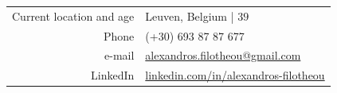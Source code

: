 \documentclass[a4paper,10pt,twoside]{article}
\begin{document}


\par{\bigskip\par}
\vspace{4em}
\begin{center}
\begin{tabular}{rp{10cm}}
Current location and age                & Leuven, Belgium | $39$ \\
Phone                                   & (+30) 693 87 87 677 \\
e-mail                                  & \href{mailto:alexandros.filotheou@gmail.com}{alexandros.filotheou@gmail.com} \\
LinkedIn                                & \href{https://www.linkedin.com/in/alexandros-filotheou/}{linkedin.com/in/alexandros-filotheou}
\end{tabular}
\end{center}

\vfill
\end{document}
